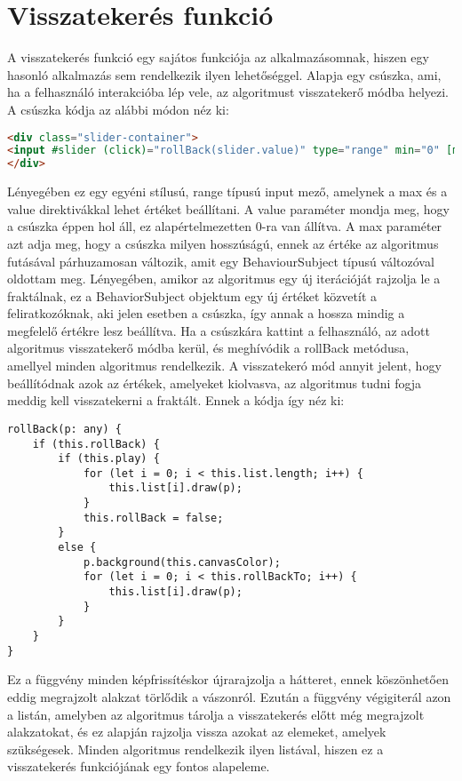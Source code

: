 \section*{Visszatekerés funkció}
A visszatekerés funkció egy sajátos funkciója az alkalmazásomnak, hiszen egy hasonló alkalmazás sem rendelkezik ilyen lehetőséggel. Alapja egy csúszka, ami, ha a felhasználó interakcióba lép vele, az algoritmust visszatekerő módba helyezi. A csúszka kódja az alábbi módon néz ki:
\begin{lstlisting}[language=html]
<div class="slider-container">
<input #slider (click)="rollBack(slider.value)" type="range" min="0" [max]="sliderLength" [value]="sliderLength" class="slider" id="myRange">
</div>
\end{lstlisting}
Lényegében ez egy egyéni stílusú, range típusú input mező, amelynek a max és a value direktivákkal lehet értéket beállítani. A value paraméter mondja meg, hogy a csúszka éppen hol áll, ez alapértelmezetten 0-ra van állítva. A max paraméter azt adja meg, hogy a csúszka milyen hosszúságú, ennek az értéke az algoritmus futásával párhuzamosan változik, amit egy BehaviourSubject típusú változóval oldottam meg. Lényegében, amikor az algoritmus egy új iterációját rajzolja le a fraktálnak, ez a BehaviorSubject objektum egy új értéket közvetít a feliratkozóknak, aki jelen esetben a csúszka, így annak a hossza mindig a megfelelő értékre lesz beállítva. Ha a csúszkára kattint a felhasználó, az adott algoritmus visszatekerő módba kerül, és meghívódik a rollBack metódusa, amellyel minden algoritmus rendelkezik. A visszatekeró mód annyit jelent, hogy beállítódnak azok az értékek, amelyeket kiolvasva, az algoritmus tudni fogja meddig kell visszatekerni a fraktált. Ennek a kódja így néz ki:
\begin{lstlisting}
rollBack(p: any) {
	if (this.rollBack) {
		if (this.play) {
			for (let i = 0; i < this.list.length; i++) {
				this.list[i].draw(p);
			}
			this.rollBack = false;
		}
		else {
			p.background(this.canvasColor);
			for (let i = 0; i < this.rollBackTo; i++) {
				this.list[i].draw(p);
			}
		}
	}
}
\end{lstlisting}
Ez a függvény minden képfrissítéskor újrarajzolja a hátteret, ennek köszönhetően eddig megrajzolt alakzat törlődik a vászonról. Ezután a függvény végigiterál azon a listán, amelyben az algoritmus tárolja a visszatekerés előtt még megrajzolt alakzatokat, és ez alapján rajzolja vissza azokat az elemeket, amelyek szükségesek. Minden algoritmus rendelkezik ilyen listával, hiszen ez a visszatekerés funkciójának egy fontos alapeleme.
